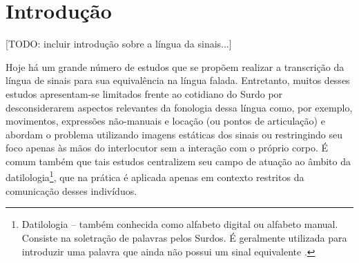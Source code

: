 

\maketitle
\begin{abstract}
Este trabalho propõe a aplicação de um modelo de aprendizagem profunda baseado em grafos, conhecido como Rede Convolucional de Grafos Espaço-Temporais, para o reconhecimento de sinais da língua sinalizada. Trata-se de uma abordagem centrada no movimento do corpo humano, o qual é capturado no espaço e no tempo e representado na forma de grafos, que são posteriormente aprendidos automaticamente pelo modelo.
\end{abstract}



\section{Introdução} %
\label{sec:introducao}
[TODO: incluir introdução sobre a língua da sinais...]

Hoje há um grande número de estudos que se propõem realizar a transcrição da língua de sinais para sua equivalência na língua falada. Entretanto, muitos desses estudos apresentam-se limitados frente ao cotidiano do Surdo por desconsiderarem aspectos relevantes da fonologia dessa língua como, por exemplo, movimentos, expressões não-manuais e locação (ou pontos de articulação) \cite{quadros-2004} e abordam o problema utilizando imagens estáticas dos sinais ou restringindo seu foco apenas às mãos do interlocutor sem a interação com o próprio corpo. É comum também que tais estudos centralizem seu campo de atuação ao âmbito da datilologia\footnote{
     Datilologia – também conhecida como alfabeto digital ou alfabeto manual. Consiste na soletração de palavras pelos Surdos. É geralmente utilizada para introduzir uma palavra que ainda não possui um sinal equivalente \cite{quadros-2004, pereira-choi-2011}.
}, que na prática é aplicada apenas em contexto restritos da comunicação desses indivíduos.

